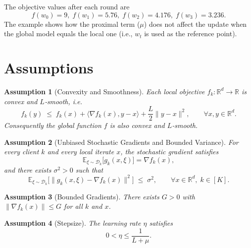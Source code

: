 \documentclass[11pt]{article}
\newtheorem{assumption}{Assumption}
\newcommand{\E}{\mathbb{E}}
\newcommand{\R}{\mathbb{R}}
\begin{document}
The objective values after each round are
\[
f(w_0)=9,\; f(w_1)=5.76,\; f(w_2)=4.176,\; f(w_3)=3.236.
\]
The example shows how the proximal term ($\mu$) does not affect the update when
the global model equals the local one (i.e., $w_t$ is used as the reference point).

\section*{Assumptions}
\begin{assumption}[Convexity and Smoothness]
\label{ass:convex-smooth}
Each local objective $f_k:\R^{d}\to\R$ is convex and $L$‑smooth, i.e.
\[
f_k(y)\;\le\;f_k(x)+\langle\nabla f_k(x),y-x\rangle+\frac{L}{2}\|y-x\|^{2},
\qquad\forall x,y\in\R^{d}.
\]
Consequently the global function $f$ is also convex and $L$‑smooth.
\end{assumption}

\begin{assumption}[Unbiased Stochastic Gradients and Bounded Variance]
\label{ass:unbiased}
For every client $k$ and every local iterate $x$, the stochastic gradient satisfies
\[
\E_{\xi\sim\mathcal{D}_k}\bigl[g_k(x,\xi)\bigr]=\nabla f_k(x),
\]
and there exists $\sigma^{2}>0$ such that
\[
\E_{\xi\sim\mathcal{D}_k}\!\bigl[\|g_k(x,\xi)-\nabla f_k(x)\|^{2}\bigr]\;\le\;\sigma^{2},
\qquad\forall x\in\R^{d},\;k\in[K].
\]
\end{assumption}

\begin{assumption}[Bounded Gradients]
\label{ass:bounded-grad}
There exists $G>0$ with $\|\nabla f_k(x)\|\le G$ for all $k$ and $x$.
\end{assumption}

\begin{assumption}[Stepsize]
\label{ass:stepsize}
The learning rate $\eta$ satisfies
\[
0<\eta\le\frac{1}{L+\mu}.
\]
\end{assumption}

\end{document}
